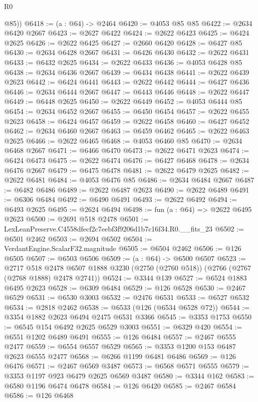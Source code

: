 \begin{lexlean}{R0}
\begin{coremodule}
        @85))
@6418 := (a : @64) -> @2464
@6420 := @4053 @85 @85
@6422 := @2634 @6420 @2667
@6423 := @2627 @6422
@6424 := @2622 @6423
@6425 := @6424 @2625
@6426 := @2622 @6425
@6427 := @2660 @6420
@6428 := @6427 @85
@6430 := @2634 @6428 @2667
@6431 := @6426 @6430
@6432 := @2622 @6431
@6433 := @6432 @2625
@6434 := @2622 @6433
@6436 := @4053 @6428 @85
@6438 := @2634 @6436 @2667
@6439 := @6434 @6438
@6441 := @2622 @6439 @2623
@6442 := @6424 @6441
@6443 := @2622 @6442
@6444 := @6427 @6436
@6446 := @2634 @6444 @2667
@6447 := @6443 @6446
@6448 := @2622 @6447
@6449 := @6448 @2625
@6450 := @2622 @6449
@6452 := @4053 @6444 @85
@6454 := @2634 @6452 @2667
@6455 := @6450 @6454
@6457 := @2622 @6455 @2623
@6458 := @6424 @6457
@6459 := @2622 @6458
@6460 := @6427 @6452
@6462 := @2634 @6460 @2667
@6463 := @6459 @6462
@6465 := @2622 @6463 @2625
@6466 := @2622 @6465
@6468 := @4053 @6460 @85
@6470 := @2634 @6468 @2667
@6471 := @6466 @6470
@6473 := @2622 @6471 @2623
@6474 := @6424 @6473
@6475 := @2622 @6474
@6476 := @6427 @6468
@6478 := @2634 @6476 @2667
@6479 := @6475 @6478
@6481 := @2622 @6479 @2625
@6482 := @2622 @6481
@6484 := @4053 @6476 @85
@6486 := @2634 @6484 @2667
@6487 := @6482 @6486
@6489 := @2622 @6487 @2623
@6490 := @2622 @6489
@6491 := @6306 @6484
@6492 := @6490 @6491
@6493 := @2622 @6492
@6494 := @6493 @2625
@6495 := @2624 @6494
@6498 := fun (a : @64) => @2622 @6495 @2623
@6500 := @2691 @518 @2478
@6501 := LexLeanPreserve.C4558dfecf2c7eebf3f9206d1b7c16f34.R0.__fits_23
@6502 := @6501 @2462
@6503 := @2694 @6502
@6504 := VerdantEngine.ScalarF32.magnitude
@6505 := @6504 @2462
@6506 := @126 @6505
@6507 := @6503 @6506
@6509 := (a : @64) -> @6500 @6507
@6523 := @2717
    @518
    @2478
    @6507
    @1888
    @3230
    (@2750 (@2760 @518))
    (@2766 (@2767 (@2768 @1888) @2478 @2741))
@6524 := @3344 @139
@6527 := @6524 @1883 @6495 @2623
@6528 := @6309 @6484
@6529 := @126 @6528
@6530 := @2467 @6529
@6531 := @6530 @3003
@6532 := @2476 @6531
@6533 := @6527 @6532
@6534 := @2818 @2462
@6538 := @6533 (@126 (@6534 @6528 @72))
@6544 := @3354 @1882 @2623 @6494 @2475 @6531 @3366
@6545 := @3353 @1753
@6550 := @6545 @154 @6492 @2625 @6529 @3003
@6551 := @6329 @420
@6554 := @6551 @1202 @6489 @6491
@6555 := @126 @6484
@6557 := @2467 @6555 @2477
@6559 := @6554 @6557 @6529
@6565 := @3353 @1200 @153 @6487 @2623 @6555 @2477
@6568 := @6266 @1199 @6481 @6486
@6569 := @126 @6476
@6571 := @2467 @6569 @3487
@6573 := @6568 @6571 @6555
@6579 := @3353 @1197 @923 @6479 @2625 @6569 @3487
@6580 := @3344 @162
@6583 := @6580 @1196 @6474 @6478
@6584 := @126 @6420
@6585 := @2467 @6584
@6586 := @126 @6468

\end{coremodule}
\end{lexlean}
